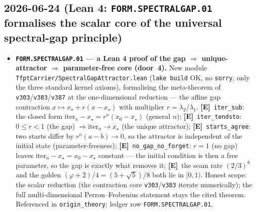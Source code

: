 \documentclass[11pt]{article}
\providecommand{\mE}{\textbf{[E]}}\providecommand{\mC}{\textbf{[C]}}
\providecommand{\vref}[1]{\texttt{#1}}
\begin{document}
\subsection*{2026-06-24 (Lean 4: \texttt{FORM.SPECTRALGAP.01} formalises the scalar core of the universal spectral-gap principle)}
\begin{itemize}
\item \textbf{\texttt{FORM.SPECTRALGAP.01} --- a Lean 4 proof of the gap $\Rightarrow$ unique-attractor $\Rightarrow$
parameter-free core (door~4).} New module \texttt{TfptCarrier/SpectralGapAttractor.lean} (\texttt{lake build} OK,
no \texttt{sorry}, only the three standard kernel axioms), formalising the meta-theorem of \vref{v303}/\vref{v383}/\vref{v387}
at the one-dimensional reduction --- the affine gap contraction $x\mapsto x_\star+r(x-x_\star)$ with multiplier
$r=\lambda_2/\lambda_1$. \mE\ \texttt{iter\_sub}: the closed form $\mathrm{iter}_n-x_\star=r^n(x_0-x_\star)$ (general $n$);
\mE\ \texttt{iter\_tendsto}: $0\le r<1$ (the gap) $\Rightarrow\mathrm{iter}_n\to x_\star$ (the unique attractor);
\mE\ \texttt{starts\_agree}: two starts differ by $r^n(a-b)\to0$, so the attractor is independent of the initial state
(parameter-freeness); \mE\ \texttt{no\_gap\_no\_forget}: $r=1$ (no gap) leaves $\mathrm{iter}_n-x_\star=x_0-x_\star$ constant
--- the initial condition is then a free parameter, so the gap is exactly what removes it; \mE\ the seam rate $(2/3)^6$ and
the golden $(\varphi+2)/4=(5+\sqrt5)/8$ both lie in $[0,1)$. Honest scope: the scalar reduction (the contraction core
\vref{v303}/\vref{v383} iterate numerically); the full multi-dimensional Perron--Frobenius statement stays the cited theorem.
Referenced in \texttt{origin\_theory}; ledger row \texttt{FORM.SPECTRALGAP.01}.
\end{itemize}
\end{document}
